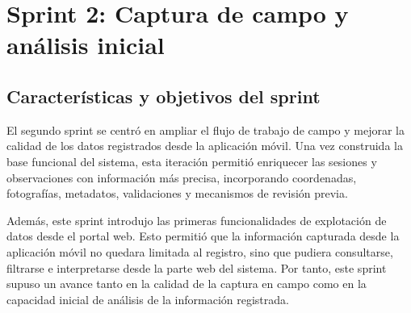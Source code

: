 
\clearpage
\section{Sprint 2: Captura de campo y análisis inicial}
\subsection{Características y objetivos del sprint}

El segundo sprint se centró en ampliar el flujo de trabajo de campo y mejorar
la calidad de los datos registrados desde la aplicación móvil. Una vez
construida la base funcional del sistema, esta iteración permitió enriquecer las
sesiones y observaciones con información más precisa, incorporando coordenadas,
fotografías, metadatos, validaciones y mecanismos de revisión previa.

Además, este sprint introdujo las primeras funcionalidades de explotación de
datos desde el portal web. Esto permitió que la información capturada desde la
aplicación móvil no quedara limitada al registro, sino que pudiera consultarse,
filtrarse e interpretarse desde la parte web del sistema. Por tanto, este sprint
supuso un avance tanto en la calidad de la captura en campo como en la capacidad
inicial de análisis de la información registrada.

